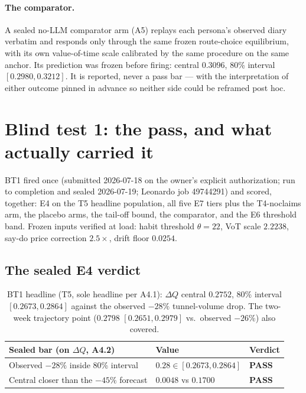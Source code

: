 \documentclass[11pt]{article}
\newcommand{\dq}{\Delta Q}
\begin{document}
\paragraph{The comparator.} A sealed no-LLM comparator arm (A5) replays
each persona's observed diary verbatim and responds only through the
same frozen route-choice equilibrium, with its own value-of-time scale
calibrated by the same procedure on the same anchor. Its prediction was
frozen before firing: central $0.3096$, 80\% interval
$[0.2980, 0.3212]$. It is reported, never a pass bar --- with the
interpretation of either outcome pinned in advance so neither side
could be reframed post hoc.

\section{Blind test 1: the pass, and what actually carried it}
\label{sec:bt1}

BT1 fired once (submitted 2026-07-18 on the owner's explicit
authorization; run to completion and sealed 2026-07-19; Leonardo job
49744291) and scored,
together: E4 on the T5 headline population, all five E7 tiers plus the
T4-noclaims arm, the placebo arms, the tail-off bound, the comparator,
and the E6 threshold band. Frozen inputs verified at load: habit
threshold $\theta=22$, VoT scale $2.2238$, say-do price correction
$2.5\times$, drift floor $0.0254$.

\subsection{The sealed E4 verdict}

\begin{table}[h]
\centering\small
\begin{tabular}{lll}
\toprule
Sealed bar (on $\dq$, A4.2) & Value & Verdict \\
\midrule
Observed $-28\%$ inside 80\% interval & $0.28 \in [0.2673, 0.2864]$ & \textbf{PASS} \\
Central closer than the $-45\%$ forecast & $0.0048$ vs $0.1700$ & \textbf{PASS} \\
\bottomrule
\end{tabular}
\caption{BT1 headline (T5, sole headline per A4.1):
$\dq$ central $0.2752$, 80\% interval $[0.2673, 0.2864]$ against the
observed $-28\%$ tunnel-volume drop. The two-week trajectory point
($0.2798$ $[0.2651,0.2979]$ vs.\ observed $-26\%$) also covered.}
\label{tab:bt1}
\end{table}
\end{document}
